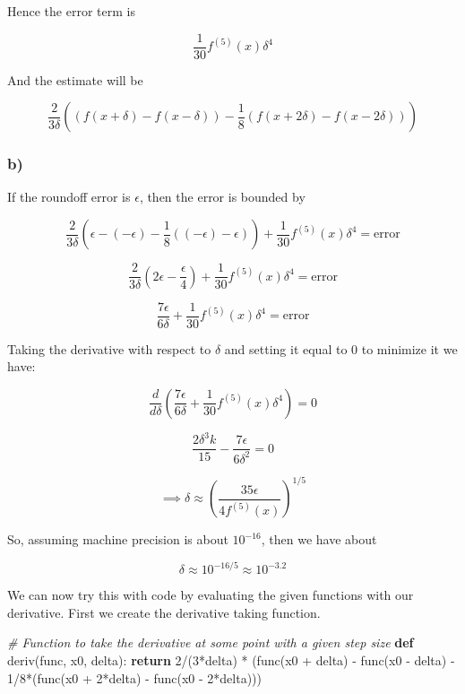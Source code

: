 \documentclass[
]{article}
\newenvironment{Shaded}{}{}
\newcommand{\CommentTok}[1]{\textcolor[rgb]{0.38,0.63,0.69}{\textit{#1}}}
\newcommand{\ControlFlowTok}[1]{\textcolor[rgb]{0.00,0.44,0.13}{\textbf{#1}}}
\newcommand{\DecValTok}[1]{\textcolor[rgb]{0.25,0.63,0.44}{#1}}
\newcommand{\KeywordTok}[1]{\textcolor[rgb]{0.00,0.44,0.13}{\textbf{#1}}}
\newcommand{\NormalTok}[1]{#1}
\newcommand{\OperatorTok}[1]{\textcolor[rgb]{0.40,0.40,0.40}{#1}}
\begin{document}
Hence the error term is

\[\frac{1}{30} f^{(5)}(x) \delta^4\]

And the estimate will be

\[\frac{2}{3 \delta} \left((f(x + \delta)-f(x-\delta ))-\frac{1}{8} (f(x + 2 \delta)-f(x-2 \delta ))\right)\]

\hypertarget{b}{%
\subsubsection{b)}\label{b}}

If the roundoff error is \(\epsilon\), then the error is bounded by

\[\frac{2}{3 \delta} \left(\epsilon-(-\epsilon)-\frac{1}{8} ((-\epsilon)-\epsilon)\right) + \frac{1}{30} f^{(5)}(x) \delta^4 = \text{error}\]

\[\frac{2}{3 \delta} \left(2 \epsilon-\frac{\epsilon}{4} \right) + \frac{1}{30} f^{(5)}(x) \delta^4 = \text{error}\]

\[ \frac{7\epsilon}{6 \delta}  + \frac{1}{30} f^{(5)}(x) \delta^4 = \text{error}\]

Taking the derivative with respect to \(\delta\) and setting it equal to
0 to minimize it we have:

\[ \frac{d}{d\delta} \left( \frac{7\epsilon}{6 \delta}  + \frac{1}{30} f^{(5)}(x) \delta^4 \right) = 0 \]

\[\frac{2 \delta ^3 k}{15}-\frac{7 \epsilon }{6 \delta ^2} = 0 \]

\[\implies \delta \approx \left( \frac{35 \epsilon}{4 f^{(5)}(x) } \right)^{1/5} \]

So, assuming machine precision is about \(10^{-16}\), then we have about

\[\delta \approx 10^{-16/5} \approx 10^{-3.2}\]

We can now try this with code by evaluating the given functions with our
derivative. First we create the derivative taking function.

\begin{Shaded}
\begin{Highlighting}[]
\CommentTok{\# Function to take the derivative at some point with a given step size}
\KeywordTok{def}\NormalTok{ deriv(func, x0, delta):}
    \ControlFlowTok{return} \DecValTok{2}\OperatorTok{/}\NormalTok{(}\DecValTok{3}\OperatorTok{*}\NormalTok{delta) }\OperatorTok{*}\NormalTok{ (func(x0 }\OperatorTok{+}\NormalTok{ delta) }\OperatorTok{{-}}\NormalTok{ func(x0 }\OperatorTok{{-}}\NormalTok{ delta) }\OperatorTok{{-}} \DecValTok{1}\OperatorTok{/}\DecValTok{8}\OperatorTok{*}\NormalTok{(func(x0 }\OperatorTok{+} \DecValTok{2}\OperatorTok{*}\NormalTok{delta) }\OperatorTok{{-}}\NormalTok{ func(x0 }\OperatorTok{{-}} \DecValTok{2}\OperatorTok{*}\NormalTok{delta)))}
\end{Highlighting}
\end{Shaded}
\end{document}
